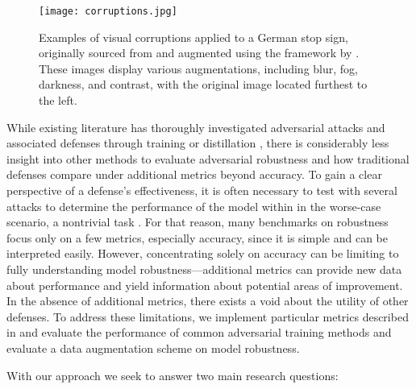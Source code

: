 \documentclass[a4paper]{article}
\begin{document}
\begin{figure}[ht]
    \centering
    \texttt{[image: corruptions.jpg]}
    \advance\leftskip-3cm
    \advance\rightskip-3cm
    \caption{
        Examples of visual corruptions applied to a German stop sign, originally sourced from \textcite{stallkamp2011tgtsrb} and augmented using the framework by \textcite{jockel2019safe}. These images display various augmentations, including blur, fog, darkness, and contrast, with the original image located furthest to the left.
    }
    \label{fig_corruptions}
\end{figure}






While existing literature has thoroughly investigated adversarial attacks
\cites{goodfellow2015explaining}{moosavidezfooli2016deepfool}{carlini2017evaluating}
and associated defenses through training or distillation
\cites{goodfellow2015explaining}{papernot2016distillation}{madry2018deeplearningmodelsresistant},
there is considerably less insight into other methods to evaluate adversarial
robustness \cite{guo2022comprehensive} and how traditional defenses compare
under additional metrics beyond accuracy. To gain a clear perspective of a
defense's effectiveness, it is often necessary to test with several attacks
to determine the performance of the model within in the worse-case scenario,
a nontrivial task
\cite{carlini2019evaluating}.
For that reason, many benchmarks on robustness focus only on a few metrics,
especially accuracy, since it is simple and can be interpreted easily. However,
concentrating solely on accuracy can be limiting to fully understanding model
robustness—additional metrics can provide new data about performance and yield
information about potential areas of improvement. In the absence of additional
metrics, there exists a void about the utility of other defenses. To address these
limitations, we implement particular metrics described in
\textcite{guo2022comprehensive}
and evaluate the performance of common adversarial training methods and evaluate a data
augmentation scheme on model robustness.

\noindent With our approach we seek to answer two main research questions:
\end{document}
